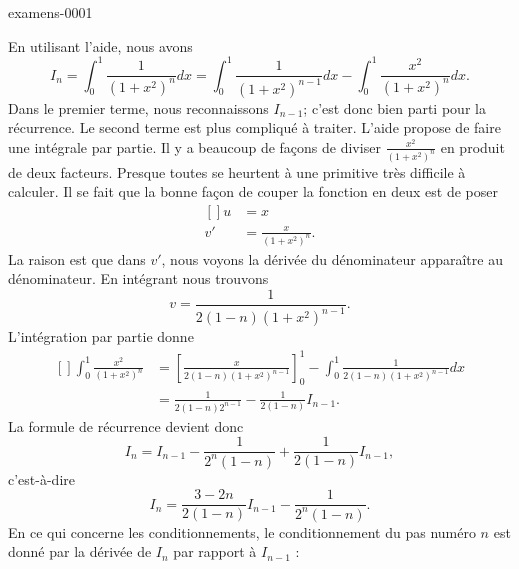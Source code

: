 
\begin{corrige}{examens-0001}

	En utilisant l'aide, nous avons
	\begin{equation}
		I_n=\int_0^1\frac{1}{ (1+x^2)^n }dx=\int_0^1\frac{1}{ (1+x^2)^{n-1} }dx-\int_0^1\frac{ x^2 }{ (1+x^2)^n }dx.
	\end{equation}
	Dans le premier terme, nous reconnaissons $I_{n-1}$; c'est donc bien parti pour la récurrence. Le second terme est plus compliqué à traiter. L'aide propose de faire une intégrale par partie. Il y a beaucoup de façons de diviser $\frac{ x^2 }{ (1+x^2)^n }$ en produit de deux facteurs. Presque toutes se heurtent à une primitive très difficile à calculer. Il se fait que la bonne façon de couper la fonction en deux est de poser
	\begin{equation}
		\begin{aligned}[]
			u&=x\\
			v'&=\frac{ x }{ (1+x^2)^n }.
		\end{aligned}
	\end{equation}
	La raison est que dans $v'$, nous voyons la dérivée du dénominateur apparaître au dénominateur. En intégrant nous trouvons
	\begin{equation}
		v=\frac{1}{ 2(1-n)(1+x^2)^{n-1} }.
	\end{equation}
	L'intégration par partie donne
	\begin{equation}
		\begin{aligned}[]
			\int_0^1\frac{ x^2 }{ (1+x^2)^n }&=\left[ \frac{ x }{ 2(1-n)(1+x^2)^{n-1} } \right]_0^1-\int_0^1\frac{1}{ 2(1-n)(1+x^2)^{n-1} }dx\\
			&=\frac{1}{ 2(1-n)2^{n-1} }-\frac{1}{ 2(1-n) }I_{n-1}.
		\end{aligned}
	\end{equation}
	La formule de récurrence devient donc
	\begin{equation}
		I_n=I_{n-1}-\frac{1}{ 2^n(1-n) }+\frac{1}{ 2(1-n) }I_{n-1},
	\end{equation}
	c'est-à-dire
	\begin{equation}
		I_n=\frac{ 3-2n }{ 2(1-n) }I_{n-1}-\frac{1}{ 2^n(1-n) }.
	\end{equation}
	En ce qui concerne les conditionnements, le conditionnement du pas numéro $n$ est donné par la dérivée de $I_n$ par rapport à $I_{n-1}$ :

\end{corrige}
